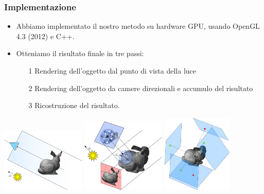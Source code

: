 \documentclass{beamer}
\begin{document}
\begin{frame}
    \frametitle{Implementazione}
			\begin{itemize}
			\item Abbiamo implementato il nostro metodo su hardware GPU, usando OpenGL 4.3 (2012) e C++.
			\item Otteniamo il risultato finale in tre passi:
			\begin{itemize}
				\item[1] Rendering dell'oggetto dal punto di vista della luce
				\item[2] Rendering dell'oggetto da camere direzionali e accumulo del risultato
				\item[3] Ricostruzione del risultato. 
			\end{itemize}
			\end{itemize}
			\includegraphics[width=0.3\textwidth]{step1.jpg} \hspace{0.5cm}	\includegraphics[width=0.3\textwidth]{step2.jpg} \hspace{0.5cm}	\includegraphics[width=0.25\textwidth]{step3.jpg}

\end{frame}
\end{document}
